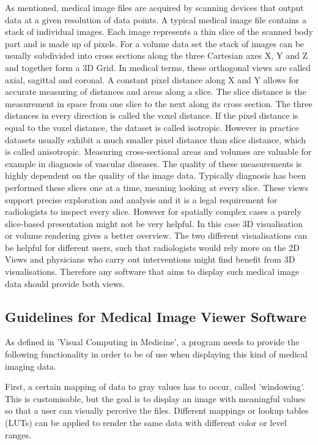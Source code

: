 \documentclass[a4paper,11pt,titlepage]{article}
\begin{document}
As mentioned, medical image files are acquired by scanning devices that output data at a given resolution of data points. A typical medical image file contains a stack of individual images. Each image represents a thin slice of the scanned body part and is made up of pixels. For a volume data set the stack of images can be usually subdivided into cross sections along the three Cartesian axes X, Y and Z and together form a 3D Grid. In medical terms, these orthogonal views are called axial, sagittal and coronal. A constant pixel distance along X and Y allows for accurate measuring of distances and areas along a slice. The slice distance is the measurement in space from one slice to the next along its cross section. The three distances in every direction is called the voxel distance. If the pixel distance is equal to the voxel distance, the dataset is called isotropic. However in practice datasets usually exhibit a much smaller pixel distance than slice distance, which is called anisotropic.
Measuring cross-sectional areas and volumes are valuable for example in diagnosis of vascular diseases. The quality of these measurements is highly dependent on the quality of the image data. Typically diagnosis has been performed these slices one at a time, meaning looking at every slice. These views support precise exploration and analysis and it is a legal requirement for radiologists to inspect every slice. However for spatially complex cases a purely slice-based presentation might not be very helpful. In this case 3D visualisation or volume rendering gives a better overview. The two different visualisations can be helpful for different users, such that radiologists would rely more on the 2D Views and physicians who carry out interventions might find benefit from 3D visualisations. Therefore any software that aims to display such medical image data should provide both views.



\subsection{Guidelines for Medical Image Viewer Software}

As defined in 'Visual Computing in Medicine'\cite{book}, a program needs to provide the following functionality in order to be of use when displaying this kind of medical imaging data. 

First, a certain mapping of data to gray values has to occur, called 'windowing'. This is customisable, but the goal is to display an image with meaningful values so that a user can visually perceive the files. Different mappings or lookup tables (LUTs) can be applied to render the same data with different color or level ranges.
\end{document}
